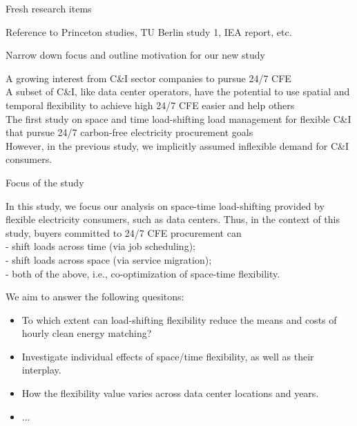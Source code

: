 \begin{frame}{Fresh research items}

  Reference to Princeton studies, TU Berlin study 1, IEA report, etc.

\end{frame}


\begin{frame}{Narrow down focus and outline motivation for our new study}

A growing interest from C\&I sector companies to pursue 24/7 CFE \\
A subset of C\&I, like data center operators, have the potential to use spatial and temporal flexibility to achieve high 24/7 CFE easier and help others \\
The first study on space and time load-shifting load management for flexible C\&I that pursue 24/7 carbon-free electricity procurement goals \\
However, in the previous study, we implicitly assumed \alert{inflexible demand} for C\&I consumers.

\end{frame}

\begin{frame}{Focus of the study}

  In this study, we focus our analysis on \alert{space-time load-shifting} provided by flexible electricity consumers, such as data centers.
  Thus, in the context of this study, buyers committed to 24/7 CFE procurement can \\
  - shift loads across \alert{time} (via job scheduling); \\
  - shift loads across \alert{space} (via service migration); \\
  - both of the above, i.e., co-optimization of space-time flexibility.

  \vspace{0.3cm}
  We aim to answer the following quesitons:
  \begin{itemize}
    \item To which extent can load-shifting flexibility reduce the \alert{means and costs} of hourly clean energy matching?\\ 
    \item Investigate \alert{individual effects} of space/time flexibility, as well as their \alert{interplay}.\\
    \item How the flexibility value varies across data center \alert{locations} and \alert{years}.\\
    \item ...
  \end{itemize}

\end{frame}


